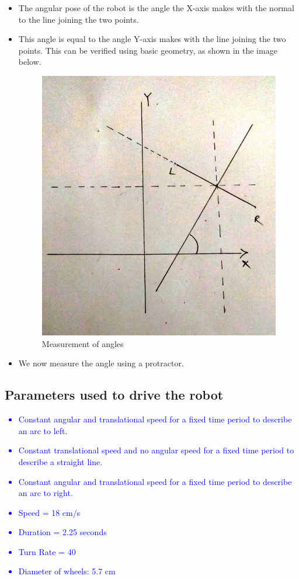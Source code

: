 \documentclass[10pt,a4paper]{article}
\begin{document}
{\begin{itemize}
\begin{itemize}
							\item The angular pose of the robot is the angle the X-axis makes with the normal to the line joining the two points.
							\item This angle is equal to the angle Y-axis makes with the line joining the two points. This can be verified using basic geometry, as shown in the image below.
							\begin{figure}[h]
								\centering
								\includegraphics[width=0.4\linewidth]{img/angles.jpeg}
								\caption{Measurement of angles}
								\label{fig:angGeometry}
							\end{figure}
							\item We now measure the angle using a protractor.
						\end{itemize}
				\end{itemize}
				}
			\subsection{Parameters used to drive the robot}\textcolor{blue}{
				\begin{itemize}
					\item Constant angular and translational speed for a fixed time period to describe an arc to left.
					\item Constant translational speed and no angular speed for a fixed time period to describe a straight line.
					\item Constant angular and translational speed for a fixed time period to describe an arc to right.
					\item Speed = 18 cm/s
					\item Duration = 2.25 seconds
					\item Turn Rate = 40
					\item Diameter of wheels: 5.7 cm
				\end{itemize}
			}
\end{document}
